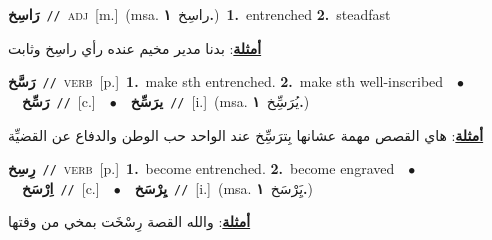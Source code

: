 \documentclass[10pt,a4paper,twoside]{article} %
\begin{document}
\begin{multicols}{2}
{\setlength\topsep{0pt}\textbf{\foreignlanguage{arabic}{رَاسِخ}}\ {\color{gray}\texttt{//}\color{black}}\ \textsc{adj}\ [m.]\ \color{gray}(msa. \foreignlanguage{arabic}{راسِخ}~\foreignlanguage{arabic}{\textbf{١.}})\color{black}\ \textbf{1.}~entrenched  \textbf{2.}~steadfast\  \begin{flushright}\color{gray}\foreignlanguage{arabic}{\textbf{\underline{\foreignlanguage{arabic}{أمثلة}}}: بدنا مدير مخيم عنده رأي راسِخ وثابت}\end{flushright}\color{black}} \vspace{2mm}

{\setlength\topsep{0pt}\textbf{\foreignlanguage{arabic}{رَسَّخ}}\ {\color{gray}\texttt{//}\color{black}}\ \textsc{verb}\ [p.]\ \textbf{1.}~make sth entrenched.  \textbf{2.}~make sth well-inscribed\ \ $\bullet$\ \ \setlength\topsep{0pt}\textbf{\foreignlanguage{arabic}{رَسِّخ}}\ {\color{gray}\texttt{//}\color{black}}\ [c.]\ \ $\bullet$\ \ \setlength\topsep{0pt}\textbf{\foreignlanguage{arabic}{يرَسِّخ}}\ {\color{gray}\texttt{//}\color{black}}\ [i.]\ \color{gray}(msa. \foreignlanguage{arabic}{يُرَسِِّخ}~\foreignlanguage{arabic}{\textbf{١.}})\color{black}\  \begin{flushright}\color{gray}\foreignlanguage{arabic}{\textbf{\underline{\foreignlanguage{arabic}{أمثلة}}}: هاي القصص مهمة عشانها بِترَسِِّخ عند الواحد حب الوطن والدفاع عن القضيِّة}\end{flushright}\color{black}} \vspace{2mm}

{\setlength\topsep{0pt}\textbf{\foreignlanguage{arabic}{رِسِخ}}\ {\color{gray}\texttt{//}\color{black}}\ \textsc{verb}\ [p.]\ \textbf{1.}~become entrenched.  \textbf{2.}~become engraved\ \ $\bullet$\ \ \setlength\topsep{0pt}\textbf{\foreignlanguage{arabic}{اِرْسَخ}}\ {\color{gray}\texttt{//}\color{black}}\ [c.]\ \ $\bullet$\ \ \setlength\topsep{0pt}\textbf{\foreignlanguage{arabic}{يِرْسَخ}}\ {\color{gray}\texttt{//}\color{black}}\ [i.]\ \color{gray}(msa. \foreignlanguage{arabic}{يَِرْسَخ}~\foreignlanguage{arabic}{\textbf{١.}})\color{black}\  \begin{flushright}\color{gray}\foreignlanguage{arabic}{\textbf{\underline{\foreignlanguage{arabic}{أمثلة}}}: والله القصة رِسْخَت بمخي من وقتها}\end{flushright}\color{black}} \vspace{2mm}


\end{multicols}
\end{document}
